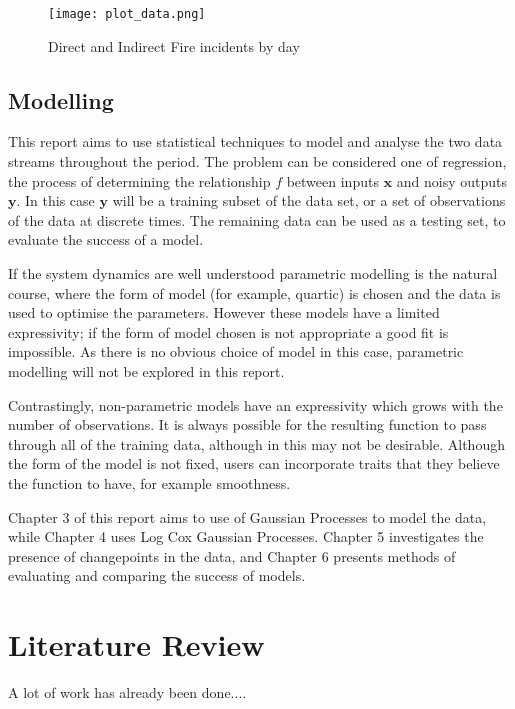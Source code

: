 \documentclass[a4paper,11pt]{report}
\begin{document}
\begin{figure}
\centering
\texttt{[image: plot\_data.png]}
\caption{Direct and Indirect Fire incidents by day}
\label{fig:sigactsdata}
\end{figure}

\section{Modelling}

This report aims to use statistical techniques to model and analyse the two data streams throughout the period. The problem can be considered one of regression, the process of determining the relationship \(f\) between inputs \(\mathbf{x}\) and noisy outputs \(\mathbf{y}\). In this case \(\mathbf{y}\) will be a training subset of the data set, or a set of observations of the data at discrete times. The remaining data can be used as a testing set, to evaluate the success of a model. \par

If the system dynamics are well understood parametric modelling is the natural course, where the form of model (for example, quartic) is chosen and the data is used to optimise the parameters. However these models have a limited expressivity; if the form of model chosen is not appropriate a good fit is impossible. As there is no obvious choice of model in this case, parametric modelling will not be explored in this report. \par

Contrastingly, non-parametric models have an expressivity which grows with the number of observations. It is always possible for the resulting function to pass through all of the training data, although in this may not be desirable. Although the form of the model is not fixed, users can incorporate traits that they believe the function to have, for example smoothness. \par

Chapter 3 of this report aims to use of Gaussian Processes to model the data, while Chapter 4 uses Log Cox Gaussian Processes. Chapter 5 investigates the presence of changepoints in the data, and Chapter 6 presents methods of evaluating and comparing the success of models. 

\chapter{Literature Review}
A lot of work has already been done....
\end{document}
